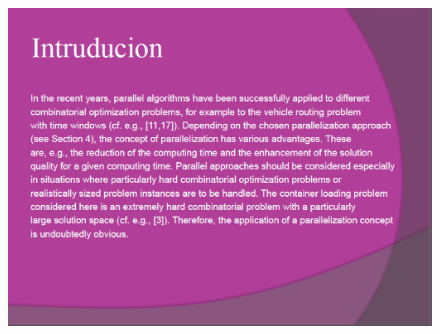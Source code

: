 \documentclass{beamer}
\begin{document}
\begin{frame}
\frametitle{ }
\begin{figure}[!th]
\begin{center}
\includegraphics[width=1\textwidth]{img/picn3.eps}
\end{center}
\end{figure}
\end{frame}
\end{document}
